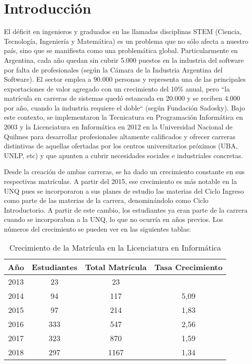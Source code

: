 \chapter{Introducción}
\label{sec:introduccion}


El déficit en ingenieros y graduados en las llamadas disciplinas STEM (Ciencia, Tecnología, Ingeniería y Matemática) es un problema que no sólo afecta a nuestro país, sino que se manifiesta como una problemática global. Particularmente en Argentina, cada año quedan sin cubrir 5.000 puestos en la industria del software por falta de profesionales (según la Cámara de la Industria Argentina del Software). El sector emplea a 90.000 personas y representa una de las principales exportaciones de valor agregado con un crecimiento del 10\% anual, pero “la matrícula en carreras de sistemas quedó estancada en 20.000 y se reciben 4.000 por año, cuando la industria requiere el doble“ (según Fundación Sadosky).
Bajo este contexto, se implementaron la Tecnicatura en Programación Informática en 2003 y la Licenciatura en Informática en 2012 en la Universidad Nacional de Quilmes para desarrollar profesionales altamente calificados y ofrecer carreras distintivas de aquellas ofertadas por los centros universitarios próximos (UBA, UNLP, etc) y que apunten a cubrir necesidades sociales e industriales concretas.
 
Desde la creación de ambas carreras, se ha dado un crecimiento constante  en sus respectivas matrículas. A partir del 2015, ese crecimiento es más notable en la UNQ pues se incorporaron a sus planes de estudio las materias del Ciclo Ingreso como parte de las materias de la carrera, denominándolo como Ciclo Introductorio. A partir de este cambio, los estudiantes ya eran parte de la carrera cuando se incorporaban a la UNQ, lo que no ocurría en años previos. Los números del crecimiento se pueden ver en las siguientes tablas:


\begin{table}[!htbp]
    \centering
    \begin{tabular}{|c|c|c|c|}
    \hline
    Año & Estudiantes & Total Matrícula & Tasa Crecimiento \\
    \hline
    2013 & 23 & 23 & \\
    \hline
    2014 & 94 & 117 & 5,09 \\ 
    \hline
    2015 & 97 & 214 & 1,83 \\
    \hline
    2016 & 333 & 547 & 2,56 \\
    \hline
    2017 & 323 & 870 & 1,59 \\ 
    \hline
    2018 & 297 & 1167 & 1,34 \\ 
    \hline
    \end{tabular}
    \caption{Crecimiento de la Matrícula en la Licenciatura en Informática}
    \label{tab:tabla_planes}
\end{table}



